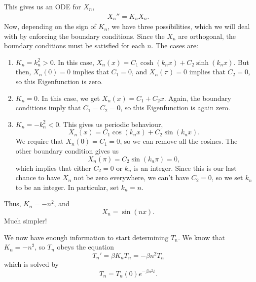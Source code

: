 \documentclass[10pt,driverfallback=hypertex]{report}
\begin{document}
This gives us an ODE for $X_n$,
\begin{eqnarray}
  \label{Eigenfunction}
  \boxed{X_n'' = K_n X_n.}
\end{eqnarray}
Now, depending on the sign of $K_n$, we have three possibilities, which we will
deal with by enforcing the boundary conditions. Since the $X_n$ are orthogonal,
the boundary conditions must be satisfied for each $n$. The cases are:
\begin{enumerate}
  \item $K_n=k_n^2 > 0$. In this case, $X_n(x)= C_1 \cosh(k_n x) +C_2
    \sinh(k_n x)$.  But then, $X_n(0)=0$ implies that $C_1=0$, and
    $X_n(\pi)=0$ implies that $C_2=0$, so this Eigenfunction is zero.
  \item $K_n = 0$. In this case, we get $X_n(x)=C_1 +C_2 x$. Again,
    the boundary conditions imply that $C_1=C_2=0$, so this
    Eigenfunction is again zero.
  \item $K_n =-k_n^2 < 0$. This gives us periodic behaviour,
    \begin{dmath*}
      X_n(x)=C_1\cos(k_nx) + C_2\sin(k_nx).
    \end{dmath*}
    We require that $X_n(0)=C_1=0$, so we can remove all the cosines. The
    other boundary condition gives us
    \begin{dmath*}[compact]
      X_n(\pi)=C_2\sin(k_n\pi)=0,
    \end{dmath*}
    which implies that either $C_2=0$ or $k_n$ is an integer. Since this is
    our last chance to have $X_n$ not be zero everywhere, we can't have $C_2=0$,
    so we set $k_n$ to be an integer. In particular, set $k_n=n$.
\end{enumerate}
Thus, $K_n=-n^2$, and 
\begin{dmath*}
  \boxed{X_n= \sin(nx).}
\end{dmath*}
Much simpler!

We now have enough information to start determining $T_n$. We know that
$K_n=-n^2$, so $T_n$ obeys the equation
\begin{dmath*}[compact]
  T_n' = \beta K_n T_n = - \beta n^2 T_n
\end{dmath*}
which is solved by
\begin{dmath*}[compact]
  \boxed{T_n = T_n(0) e^{-\beta n^2 t}.}
\end{dmath*}
\end{document}
